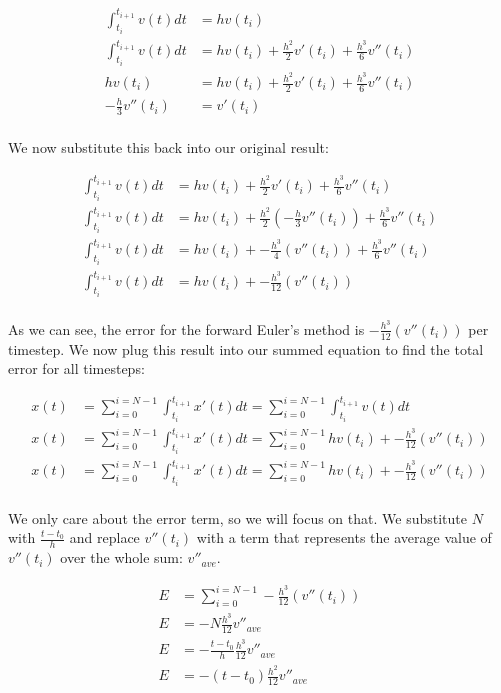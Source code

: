 \documentclass[10pt]{article} %
\begin{document}
\begin{align}
  \int_{t_i}^{t_{i+1}} v(t)dt &= hv(t_i)\\
  \int_{t_i}^{t_{i+1}} v(t)dt &= hv(t_i) + \frac{h^2}{2}v'(t_i) + \frac{h^3}{6}v''(t_i)\\
  hv(t_i) &= hv(t_i) + \frac{h^2}{2}v'(t_i) + \frac{h^3}{6}v''(t_i)\\
  -\frac{h}{3}v''(t_i) &= v'(t_i)\\  
\end{align}

We now substitute this back into our original result:

\begin{align}
  \int_{t_i}^{t_{i+1}} v(t)dt &= hv(t_i) + \frac{h^2}{2}v'(t_i) + \frac{h^3}{6}v''(t_i) \\
  \int_{t_i}^{t_{i+1}} v(t)dt &= hv(t_i) + \frac{h^2}{2}(-\frac{h}{3}v''(t_i)) + \frac{h^3}{6}v''(t_i) \\
  \int_{t_i}^{t_{i+1}} v(t)dt &= hv(t_i) + -\frac{h^3}{4}(v''(t_i)) + \frac{h^3}{6}v''(t_i) \\
  \int_{t_i}^{t_{i+1}} v(t)dt &= hv(t_i) + -\frac{h^3}{12}(v''(t_i))\\
\end{align}

As we can see, the error for the forward Euler's method is $-\frac{h^3}{12}(v''(t_i))$ per timestep. We now plug this result into our summed equation to find the total error for all timesteps:

\begin{align}
  x(t) &= \sum_{i=0}^{i=N-1} \int_{t_i}^{t_{i+1}} x'(t)dt = \sum_{i=0}^{i=N-1} \int_{t_i}^{t_{i+1}} v(t)dt\\
  x(t) &= \sum_{i=0}^{i=N-1} \int_{t_i}^{t_{i+1}} x'(t)dt = \sum_{i=0}^{i=N-1} hv(t_i) + -\frac{h^3}{12}(v''(t_i))\\
  x(t) &= \sum_{i=0}^{i=N-1} \int_{t_i}^{t_{i+1}} x'(t)dt = \sum_{i=0}^{i=N-1} hv(t_i) + -\frac{h^3}{12}(v''(t_i))\\  
\end{align}

We only care about the error term, so we will focus on that. We substitute $N$ with $\frac{t - t_0}{h}$ and replace $v''(t_i)$ with a term that represents the average value of $v''(t_i)$ over the whole sum: $v''_{ave}$.

\begin{align}
  E &= \sum_{i=0}^{i=N-1} -\frac{h^3}{12}(v''(t_i))\\
  E &= -N\frac{h^3}{12}v''_{ave}\\
  E &= -\frac{t - t_0}{h} \frac{h^3}{12}v''_{ave}\\
  E &= -(t - t_0)\frac{h^2}{12}v''_{ave}\\    
\end{align}
\end{document}
